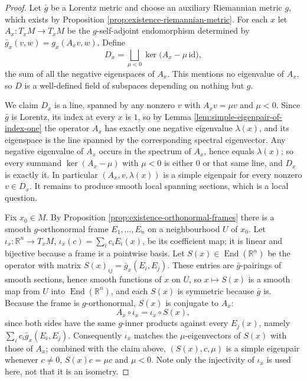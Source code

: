 \begin{proof}
\leanok
{}
Let $\bar{g}$ be a Lorentz metric and choose an auxiliary Riemannian metric $g$, which exists by Proposition \ref{prop:existence-riemannian-metric}. For each $x$ let $A_x : T_xM \to T_xM$ be the $g$-self-adjoint endomorphism determined by $\bar{g}_x(v,w) = g_x(A_xv, w)$. Define
\[
  D_x = \bigsqcup_{\mu < 0} \ker\bigl(A_x - \mu\,\mathrm{id}\bigr),
\]
the sum of all the negative eigenspaces of $A_x$. This mentions no eigenvalue of $A_x$, so $D$ is a well-defined field of subspaces depending on nothing but $g$.

We claim $D_x$ is a line, spanned by any nonzero $v$ with $A_xv = \mu v$ and $\mu < 0$. Since $\bar{g}$ is Lorentz, its index at every $x$ is $1$, so by Lemma \ref{lem:simple-eigenpair-of-index-one} the operator $A_x$ has exactly one negative eigenvalue $\lambda(x)$, and its eigenspace is the line spanned by the corresponding spectral eigenvector. Any negative eigenvalue of $A_x$ occurs in the spectrum of $A_x$, hence equals $\lambda(x)$; so every summand $\ker(A_x - \mu)$ with $\mu < 0$ is either $0$ or that same line, and $D_x$ is exactly it. In particular $(A_x, v, \lambda(x))$ is a simple eigenpair for every nonzero $v \in D_x$. It remains to produce smooth local spanning sections, which is a local question.

Fix $x_0 \in M$. By Proposition \ref{prop:existence-orthonormal-frames} there is a smooth $g$-orthonormal frame $E_1,\dots,E_n$ on a neighbourhood $U$ of $x_0$. Let $\iota_x : \mathbb{R}^n \to T_xM$, $\iota_x(c) = \sum_i c_i E_i(x)$, be its coefficient map; it is linear and bijective because a frame is a pointwise basis. Let $S(x) \in \operatorname{End}(\mathbb{R}^n)$ be the operator with matrix $S(x)_{ij} = \bar{g}_x(E_i, E_j)$. These entries are $\bar{g}$-pairings of smooth sections, hence smooth functions of $x$ on $U$, so $x \mapsto S(x)$ is a smooth map from $U$ into $\operatorname{End}(\mathbb{R}^n)$, and each $S(x)$ is symmetric because $\bar g$ is. Because the frame is $g$-orthonormal, $S(x)$ is conjugate to $A_x$:
\[
  A_x \circ \iota_x = \iota_x \circ S(x),
\]
since both sides have the same $g$-inner products against every $E_j(x)$, namely $\sum_i c_i \bar{g}_x(E_i,E_j)$. Consequently $\iota_x$ matches the $\mu$-eigenvectors of $S(x)$ with those of $A_x$; combined with the claim above, $(S(x), c, \mu)$ is a simple eigenpair whenever $c \neq 0$, $S(x)c = \mu c$ and $\mu < 0$. Note only the injectivity of $\iota_x$ is used here, not that it is an isometry.


\end{proof}
